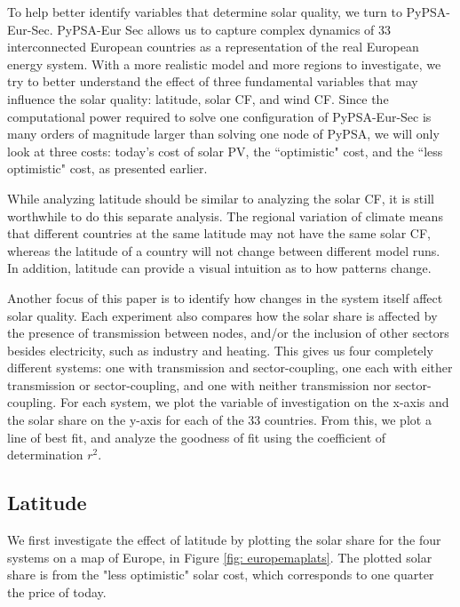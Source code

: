 \documentclass[lettersize,journal]{IEEEtran}
\begin{document}
To help better identify variables that determine solar quality, we turn to PyPSA-Eur-Sec. PyPSA-Eur Sec\cite{pypsa_eur_sec} allows us to capture complex dynamics of 33 interconnected European countries as a representation of the real European energy system. With a more realistic model and more regions to investigate, we try to better understand the effect of three fundamental variables that may influence the solar quality: latitude, solar CF, and wind CF. Since the computational power required to solve one configuration of PyPSA-Eur-Sec is many orders of magnitude larger than solving one node of PyPSA,  we will only look at three costs: today's cost of solar PV, the ``optimistic" cost, and the ``less optimistic" cost, as presented earlier.

While analyzing latitude should be similar to analyzing the solar CF, it is still worthwhile to do this separate analysis. The regional variation of climate means that different countries at the same latitude may not have the same solar CF, whereas the latitude of a country will not change between different model runs. In addition, latitude can provide a visual intuition as to how patterns change.


Another focus of this paper is to identify how changes in the system itself affect solar quality. Each experiment also compares how the solar share is affected by the presence of  transmission between nodes, and/or the inclusion of other sectors besides electricity, such as industry and heating. This gives us four completely different systems: one with transmission and sector-coupling, one each with either transmission or sector-coupling, and one with neither transmission nor sector-coupling. For each system, we plot the variable of investigation on the x-axis and the solar share on the y-axis for each of the 33 countries. From this, we plot a line of best fit, and analyze the goodness of fit using the coefficient of determination $r^{2}$.


\subsection{Latitude}



We first investigate the effect of latitude by plotting the solar share for the four systems on a map of Europe, in Figure \ref{fig: europemaplats}. The plotted solar share is from the "less optimistic" solar cost, which corresponds to one quarter the price of today. 
\end{document}
